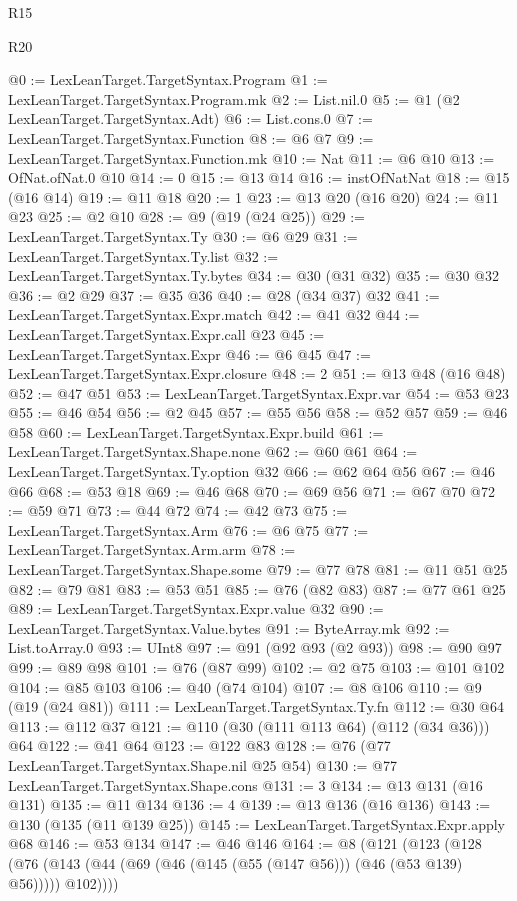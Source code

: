 \begin{lexlean}{R15}
\begin{lexlean}{R20}
\begin{coremodule}
{{{{{{{@0 := LexLeanTarget.TargetSyntax.Program
@1 := LexLeanTarget.TargetSyntax.Program.mk
@2 := List.nil.{0}
@5 := @1 (@2 LexLeanTarget.TargetSyntax.Adt)
@6 := List.cons.{0}
@7 := LexLeanTarget.TargetSyntax.Function
@8 := @6 @7
@9 := LexLeanTarget.TargetSyntax.Function.mk
@10 := Nat
@11 := @6 @10
@13 := OfNat.ofNat.{0} @10
@14 := 0
@15 := @13 @14
@16 := instOfNatNat
@18 := @15 (@16 @14)
@19 := @11 @18
@20 := 1
@23 := @13 @20 (@16 @20)
@24 := @11 @23
@25 := @2 @10
@28 := @9 (@19 (@24 @25))
@29 := LexLeanTarget.TargetSyntax.Ty
@30 := @6 @29
@31 := LexLeanTarget.TargetSyntax.Ty.list
@32 := LexLeanTarget.TargetSyntax.Ty.bytes
@34 := @30 (@31 @32)
@35 := @30 @32
@36 := @2 @29
@37 := @35 @36
@40 := @28 (@34 @37) @32
@41 := LexLeanTarget.TargetSyntax.Expr.match
@42 := @41 @32
@44 := LexLeanTarget.TargetSyntax.Expr.call @23
@45 := LexLeanTarget.TargetSyntax.Expr
@46 := @6 @45
@47 := LexLeanTarget.TargetSyntax.Expr.closure
@48 := 2
@51 := @13 @48 (@16 @48)
@52 := @47 @51
@53 := LexLeanTarget.TargetSyntax.Expr.var
@54 := @53 @23
@55 := @46 @54
@56 := @2 @45
@57 := @55 @56
@58 := @52 @57
@59 := @46 @58
@60 := LexLeanTarget.TargetSyntax.Expr.build
@61 := LexLeanTarget.TargetSyntax.Shape.none
@62 := @60 @61
@64 := LexLeanTarget.TargetSyntax.Ty.option @32
@66 := @62 @64 @56
@67 := @46 @66
@68 := @53 @18
@69 := @46 @68
@70 := @69 @56
@71 := @67 @70
@72 := @59 @71
@73 := @44 @72
@74 := @42 @73
@75 := LexLeanTarget.TargetSyntax.Arm
@76 := @6 @75
@77 := LexLeanTarget.TargetSyntax.Arm.arm
@78 := LexLeanTarget.TargetSyntax.Shape.some
@79 := @77 @78
@81 := @11 @51 @25
@82 := @79 @81
@83 := @53 @51
@85 := @76 (@82 @83)
@87 := @77 @61 @25
@89 := LexLeanTarget.TargetSyntax.Expr.value @32
@90 := LexLeanTarget.TargetSyntax.Value.bytes
@91 := ByteArray.mk
@92 := List.toArray.{0}
@93 := UInt8
@97 := @91 (@92 @93 (@2 @93))
@98 := @90 @97
@99 := @89 @98
@101 := @76 (@87 @99)
@102 := @2 @75
@103 := @101 @102
@104 := @85 @103
@106 := @40 (@74 @104)
@107 := @8 @106
@110 := @9 (@19 (@24 @81))
@111 := LexLeanTarget.TargetSyntax.Ty.fn
@112 := @30 @64
@113 := @112 @37
@121 := @110 (@30 (@111 @113 @64) (@112 (@34 @36))) @64
@122 := @41 @64
@123 := @122 @83
@128 := @76 (@77 LexLeanTarget.TargetSyntax.Shape.nil @25 @54)
@130 := @77 LexLeanTarget.TargetSyntax.Shape.cons
@131 := 3
@134 := @13 @131 (@16 @131)
@135 := @11 @134
@136 := 4
@139 := @13 @136 (@16 @136)
@143 := @130 (@135 (@11 @139 @25))
@145 := LexLeanTarget.TargetSyntax.Expr.apply @68
@146 := @53 @134
@147 := @46 @146
@164 := @8
    (@121
      (@123
        (@128 (@76 (@143 (@44 (@69 (@46 (@145 (@55 (@147 @56))) (@46 (@53 @139) @56))))) @102))))
}}}}}}}
\end{coremodule}
\end{lexlean}
\end{lexlean}
